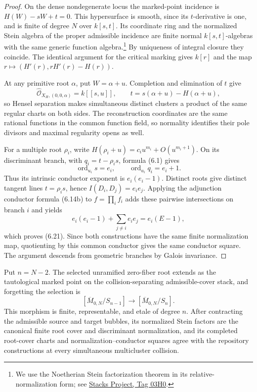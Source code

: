 \begin{proof}
On the dense nondegenerate locus the marked-point incidence is
$H(W)-sW+t=0$.  This hypersurface is smooth, since its $t$-derivative is one,
and is finite of degree $N$ over $k[s,t]$.  Its coordinate ring and the
normalized Stein algebra of the proper admissible incidence are finite normal
$k[s,t]$-algebras with the same generic function algebra.\footnote{We use
the Noetherian Stein factorization theorem in its relative-normalization form;
see \href{https://stacks.math.columbia.edu/tag/03H0}{Stacks Project, Tag
03H0}.}  By uniqueness of
integral closure they coincide.  The identical argument for the critical
marking gives $k[r]$ and the map
$r\mapsto(H'(r),rH'(r)-H(r))$.

At any primitive root $\alpha$, put $W=\alpha+u$.  Completion and elimination
of $t$ give
\[
 \widehat{\mathcal O}_{X_H,(0,0,\alpha)}=k[[s,u]],
 \qquad t=s(\alpha+u)-H(\alpha+u),                    \tag{6.22}
\]
so Hensel separation makes simultaneous distinct clusters a product of the
same regular charts on both sides.  The reconstruction coordinates are the
same rational functions in the common function field, so normality identifies
their pole divisors and maximal regularity opens as well.

For a multiple root $\rho_i$, write
$H(\rho_i+u)=c_i u^{m_i}+O(u^{m_i+1})$.  On its discriminant branch,
with $q_i=t-\rho_i s$, formula (6.1) gives
\[
 \operatorname{ord}_{u_i}s=e_i,\qquad
 \operatorname{ord}_{u_i}q_i=e_i+1.                  \tag{6.23}
\]
Thus its intrinsic conductor exponent is $e_i(e_i-1)$.  Distinct roots give
distinct tangent lines $t=\rho_i s$, hence
$I(D_i,D_j)=e_i e_j$.  Applying the adjunction conductor formula (6.14b) to
$f=\prod_i f_i$ adds these pairwise intersections on branch $i$ and yields
\[
 e_i(e_i-1)+\sum_{j\ne i}e_i e_j=e_i(E-1),
\]
which proves (6.21).  Since both constructions have the same finite
normalization map, quotienting by this common conductor gives the same
conductor square.  The argument descends from geometric branches by Galois
invariance.
\end{proof}

\begin{theorem}
\label{thm:stacky-marked-extension}
Put $n=N-2$.  The selected unramified zero-fiber root extends as the
tautological marked point on the collision-separating admissible-cover stack,
and forgetting the selection is
\[
 [\overline M_{0,N}/S_{n-1}]
 \longrightarrow [\overline M_{0,N}/S_n].
\]
This morphism is finite, representable, and etale of degree $n$.  After
contracting the admissible source and target bubbles, its normalized Stein
factors are the canonical finite root cover and discriminant normalization,
and its completed root-cover charts and normalization--conductor squares
agree with the repository constructions at every simultaneous multicluster
collision.
\end{theorem}

